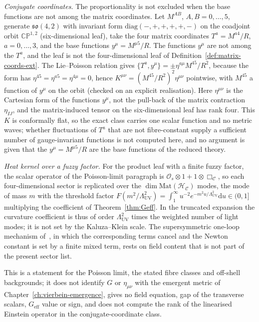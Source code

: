 \emph{Conjugate coordinates.} The proportionality is not excluded when the base functions are not among the matrix coordinates. Let \(M^{AB}\), \(A,B=0,\dots,5\), generate \(\mathfrak{so}(4,2)\) with invariant form \(\mathrm{diag}(-,+,+,+,+,-)\) on the coadjoint orbit \(\mathbb{CP}^{1,2}\) (six-dimensional leaf), take the four matrix coordinates \(T^a=M^{a4}/R\), \(a=0,\dots,3\), and the base functions \(y^\mu=M^{\mu5}/R\). The functions \(y^\mu\) are not among the \(T^a\), and the leaf is not the four-dimensional leaf of Definition~\ref{def:matrix-coords-ext}. The Lie--Poisson relation gives \(\{T^a,y^\mu\}=\pm\eta^{a\mu}M^{45}/R^2\), because the form has \(\eta^{45}=\eta^{a5}=\eta^{4\mu}=0\), hence \(K^{\mu\nu}=(M^{45}/R^2)^2\eta^{\mu\nu}\) pointwise, with \(M^{45}\) a function of \(y^\mu\) on the orbit (checked on an explicit realisation). Here \(\eta^{\mu\nu}\) is the Cartesian form of the functions \(y^\mu\), not the pull-back of the matrix contraction \(\eta_{IJ}\), and the matrix-induced tensor on the six-dimensional leaf has rank four. This \(K\) is conformally flat, so the exact class carries one scalar function and no metric waves; whether fluctuations of \(T^a\) that are not fibre-constant supply a sufficient number of gauge-invariant functions is not computed here, and no argument is given that the \(y^\mu=M^{\mu5}/R\) are the base functions of the reduced theory.



\emph{Heat kernel over a fuzzy factor.} For the product leaf with a finite fuzzy factor, the scalar operator of the Poisson-limit paragraph is \(\mathcal O_s\otimes1+1\otimes\Box_{\mathcal C}\), so each four-dimensional sector is replicated over the \(\dim\mathrm{Mat}(\mathcal H_{\mathcal C})\) modes, the mode of mass \(m\) with the threshold factor \(F(m^2/\Lambda_{\mathrm{UV}}^2)=\int_1^\infty u^{-2}e^{-m^2u/\Lambda_{\mathrm{UV}}^2}\mathrm du\in(0,1]\) multiplying the coefficient of Theorem~\ref{thm:Geff}. In the truncated expansion the curvature coefficient is thus of order \(\Lambda_{\mathrm{UV}}^2\) times the weighted number of light modes; it is not set by the Kaluza--Klein scale. The supersymmetric one-loop mechanism of~\cite{Steinacker2023}, in which the corresponding terms cancel and the Newton constant is set by a finite mixed term, rests on field content that is not part of the present sector list.



This is a statement for the Poisson limit, the stated fibre classes and off-shell backgrounds; it does not identify \(G\) or \(\eta_{\mu\nu}\) with the emergent metric of Chapter~\ref{ch:vierbein-emergence}, gives no field equation, gap of the transverse scalars, \(G_{\mathrm{eff}}\) value or sign, and does not compute the rank of the linearised Einstein operator in the conjugate-coordinate class.





